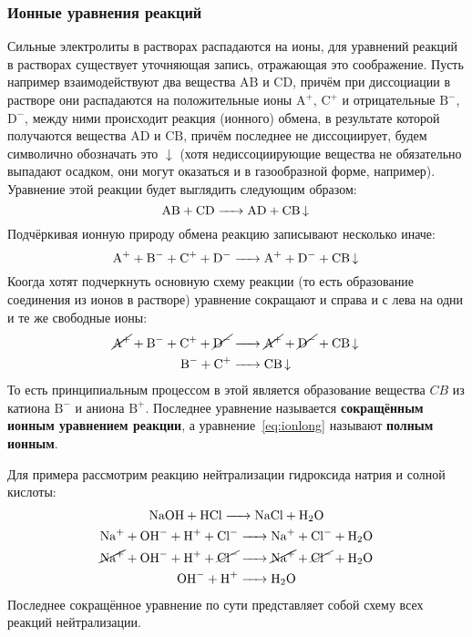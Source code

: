 \subsubsection{Ионные уравнения реакций}
Сильные электролиты в растворах распадаются на ионы, для уравнений реакций в растворах существует уточняющая запись, отражающая это соображение. Пусть например взаимодействуют два вещества $\mathrm{A}\mathrm{B}$ и $\mathrm{C}\mathrm{D}$, причём при диссоциации в растворе они распадаются на положительные ионы $\mathrm{A}^{+}$, $\mathrm{C}^{+}$ и отрицательные $\mathrm{B}^{-}$, $\mathrm{D}^{-}$, между ними происходит реакция (ионного) обмена, в результате которой получаются вещества $\mathrm{A}\mathrm{D}$ и $\mathrm{C}\mathrm{B}$, причём последнее не диссоциирует, будем символично обозначать это $\downarrow$ (хотя недиссоциирующие вещества не обязательно выпадают осадком, они могут оказаться и в газообразной форме, например). Уравнение этой реакции будет выглядить следующим образом:
\begin{equation*}
    \ce{AB + CD -> AD + CB v}
\end{equation*}
Подчёркивая ионную природу обмена реакцию записывают несколько иначе:
\begin{equation}
    \ce{A^{+} + B^{-} + C^{+} + D^{-} -> A^{+} + D^{-} + CB v}
\end{equation}
Коогда хотят подчеркнуть основную схему реакции (то есть образование соединения из ионов в растворе) уравнение сокращают и справа и с лева на  одни и те же свободные ионы:
\begin{gather*}
\label{eq:ionlong}
   \ce{\cancel{\ce{A^{+}}} + B^{-} + C^{+} + \cancel{\ce{D^{-}}} -> \cancel{\ce{A^{+}}} + \cancel{\ce{D^{-}}} + CB v} \\
   \ce{B^{-} + C^{+}  -> CB v} 
\end{gather*}
То есть принципиальным процессом в этой является образование вещества $CB$ из катиона  $\mathrm{B}^{-}$ и аниона $\mathrm{B}^{+}$. Последнее уравнение называется \textbf{сокращённым ионным уравнением реакции}, а уравнение~\ref{eq:ionlong} называют \textbf{полным ионным}.

Для примера рассмотрим реакцию нейтрализации гидроксида натрия и солной кислоты:
\begin{gather*}
    \ce{NaOH + HCl -> NaCl + H2O}\\
    \ce{Na^{+} + OH^{-} + H^{+} + Cl^{-} -> Na^{+} + Cl^{-} + H2O}\\
    \ce{\cancel{\ce{Na^{+}}} + OH^{-} + H^{+} + \cancel{\ce{Cl^{-}}} -> \cancel{\ce{Na^{+}}} + \cancel{\ce{Cl^{-}}} + H2O}\\
    \ce{OH^{-} + H^{+} -> H2O}
\end{gather*}
Последнее сокращённое уравнение по сути представляет собой схему всех реакций нейтрализации. 
